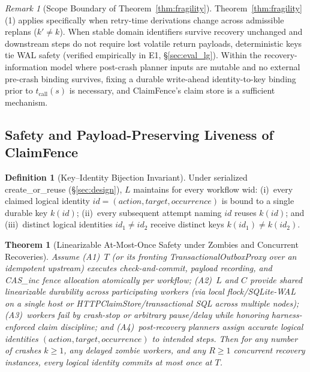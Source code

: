 \documentclass[10pt,journal]{IEEEtran}
\def\CF{ClaimFence}%
\def\texttt#1{#1}%
\newtheorem{theorem}{Theorem}
\theoremstyle{definition}
\newtheorem{definition}{Definition}
\theoremstyle{remark}
\newtheorem{remark}{Remark}
\newcommand{\CF}{\textsc{ClaimFence}}
\begin{document}
\begin{remark}[Scope Boundary of Theorem~\ref{thm:fragility}]\label{rem:scope}
Theorem~\ref{thm:fragility}(1) applies specifically when retry-time derivations change across admissible replans ($k' \neq k$). When stable domain identifiers survive recovery unchanged and downstream steps do not require lost volatile return payloads, deterministic keys tie WAL safety (verified empirically in E1, \S\ref{sec:eval_lg}). Within the recovery-information model where post-crash planner inputs are mutable and no external pre-crash binding survives, fixing a durable write-ahead identity-to-key binding prior to $t_{\mathrm{call}}(s)$ is necessary, and \CF{}'s claim store is a sufficient mechanism.
\end{remark}

\subsection{Safety and Payload-Preserving Liveness of \CF{}}

\begin{definition}[Key--Identity Bijection Invariant]\label{def:bijection}
Under serialized \texttt{create\_or\_reuse} (\S\ref{sec:design}), $L$ maintains for every workflow \texttt{wid}: (i)~every claimed logical identity $id = (\mathit{action}, \mathit{target}, \mathit{occurrence})$ is bound to a single durable key $k(id)$; (ii)~every subsequent attempt naming $id$ reuses $k(id)$; and (iii)~distinct logical identities $id_1 \neq id_2$ receive distinct keys $k(id_1) \neq k(id_2)$.
\end{definition}

\begin{theorem}[Linearizable At-Most-Once Safety under Zombies and Concurrent Recoveries]\label{thm:safety}
Assume (A1)~$T$ (or its fronting \texttt{TransactionalOutboxProxy} over an idempotent upstream) executes check-and-commit, payload recording, and \texttt{CAS\_inc} fence allocation atomically per workflow; (A2)~$L$ and $C$ provide shared linearizable durability across participating workers (via local \texttt{flock}/\texttt{SQLite-WAL} on a single host or \texttt{HTTPClaimStore}/transactional SQL across multiple nodes); (A3)~workers fail by crash-stop or arbitrary pause/delay while honoring harness-enforced claim discipline; and (A4)~post-recovery planners assign accurate logical identities $(\mathit{action}, \mathit{target}, \mathit{occurrence})$ to intended steps. Then for any number of crashes $k \ge 1$, any delayed zombie workers, and any $R \ge 1$ concurrent recovery instances, every logical identity commits at most once at $T$.
\end{theorem}
\end{document}

